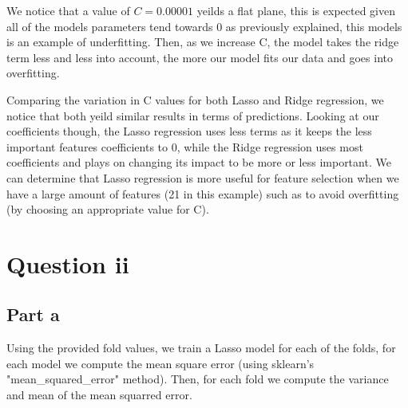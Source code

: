 \documentclass[10pt]{article}
\begin{document}
\begin{figure}[H]
\end{figure}

We notice that a value of $C = 0.00001$ yeilds a flat plane, this is expected given all of the
models parameters tend towards 0 as previously explained, this models is an example of underfitting. Then, as we increase C,
the model takes the ridge term less and less into account, the more our model fits our data and goes into overfitting.


Comparing the variation in C values for both Lasso and Ridge regression, we notice that both yeild similar results
in terms of predictions. Looking at our coefficients though, the Lasso regression uses less terms as it
keeps the less important features coefficients to 0, while the Ridge regression uses most coefficients
and plays on changing its impact to be more or less important. We can determine that Lasso regression
is more useful for feature selection when we have a large amount of features (21 in this example) such as to avoid
overfitting (by choosing an appropriate value for C).


\section*{Question ii}
\subsection*{Part a}

Using the provided fold values, we train a Lasso model for each of the folds,
for each model we compute the mean square error (using sklearn's "mean\_squared\_error" method).
Then, for each fold we compute the variance and mean of the mean squarred error.
\end{document}
